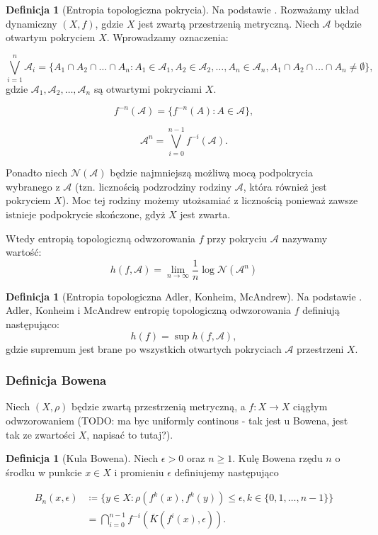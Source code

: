 \documentclass[licencjacka]{pwr_wmat_praca_dyplomowa}
\theoremstyle{plain}
\numberwithin{theorem}{chapter}
\theoremstyle{definition}
\numberwithin{theorem}{chapter}
\newtheorem{definition}[theorem]{Definicja}
\begin{document}
\begin{definition}[Entropia topologiczna pokrycia]
Na podstawie \cite{misiurewicz1993}.
Rozważamy układ dynamiczny $(X, f)$, gdzie $X$ jest zwartą przestrzenią metryczną. Niech $\mathcal{A}$ będzie otwartym pokryciem $X$.
Wprowadzamy oznaczenia:

$$\bigvee_{i=1}^n \mathcal{A}_i = \{A_1 \cap A_2 \cap \ldots \cap A_n : A_1 \in \mathcal{A}_1, A_2 \in \mathcal{A}_2, \ldots, A_n \in \mathcal{A}_n, A_1 \cap A_2 \cap \ldots \cap A_n \neq \emptyset \},$$ 
gdzie $\mathcal{A}_1, \mathcal{A}_2, \ldots, \mathcal{A}_n$ są otwartymi pokryciami $X$.

$$f^{-n}(\mathcal{A}) = \{f^{-n}(A):A\in \mathcal{A}\},$$

$$\mathcal{A}^n = \bigvee_{i=0}^{n-1}f^{-i}(\mathcal{A}).$$

Ponadto niech $\mathcal{N}(\mathcal{A})$ będzie najmniejszą możliwą mocą podpokrycia wybranego z $\mathcal{A}$ (tzn. licznością podzrodziny rodziny $\mathcal{A}$, która również jest pokryciem $X$). Moc tej rodziny możemy utożsamiać z licznością ponieważ zawsze istnieje podpokrycie skończone, gdyż $X$ jest zwarta.

Wtedy entropią topologiczną odwzorowania $f$ przy pokryciu $\mathcal{A}$ nazywamy wartość:
$$h(f, \mathcal{A}) = \lim_{n \rightarrow \infty}{\frac{1}{n}\log\mathcal{N}(\mathcal{A}^n)}$$
\end{definition}

\begin{definition}[Entropia topologiczna Adler, Konheim, McAndrew]
\label{definicja_entropii_topologicznej_adlera}
Na podstawie \cite{misiurewicz1993}.
Adler, Konheim i McAndrew entropię topologiczną odwzorowania $f$ definiują następująco: 
$$h(f) = \sup h(f, \mathcal{A}),$$ gdzie supremum jest brane po wszystkich otwartych pokryciach $\mathcal{A}$ przestrzeni $X$.
\end{definition}


\subsubsection{Definicja Bowena}
\cite{ruette2017chaos}

Niech $(X, \rho)$ będzie zwartą przestrzenią metryczną, a $f: X \rightarrow X$ ciągłym odwzorowaniem (TODO: ma byc uniformly continous - tak jest u Bowena, jest tak ze zwartości $X$, napisać to tutaj?).

\begin{definition}[Kula Bowena]
Niech  $\epsilon > 0$ oraz $n \geq 1$. Kulę Bowena rzędu $n$ o środku w punkcie $x \in X$ i promieniu $\epsilon$ definiujemy następująco

\begin{equation}
\begin{aligned}
B_n(x,\epsilon) & \coloneqq \{y \in X : \rho(f^k(x), f^k(y)) \leq \epsilon, k \in \{0, 1, \ldots, n-1\}\} \\
& = \bigcap_{i=0}^{n-1}f^{-i}(\overline{K}(f^i(x), \epsilon)).
\end{aligned}
\end{equation}

\end{definition} 
\end{document}
